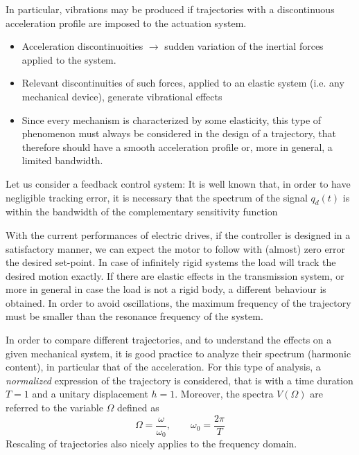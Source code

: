 \documentclass{book}
\begin{document}
In particular, vibrations may be produced if trajectories with a discontinuous acceleration profile are imposed to the actuation system. 
\begin{itemize}
    \item Acceleration discontinuoities $\rightarrow$ sudden variation of the inertial forces applied to the system. 
        \item Relevant discontinuities of such forces, applied to an elastic system (i.e. any mechanical device), generate vibrational effects 
            \item Since every mechanism is characterized by some elasticity, this type of phenomenon must always be considered in the design of a trajectory, that therefore should have a smooth acceleration profile or, more in general, a limited bandwidth.
\end{itemize}

Let us consider a feedback control system: It is well known that, in order to have negligible tracking error, it is necessary that the spectrum of the signal $q_d(t)$ is within the bandwidth of the complementary sensitivity function 

With the current performances of electric drives, if the controller is designed in a satisfactory manner, we can expect the motor to follow with (almost) zero error the desired set-point. In case of infinitely rigid systems the load will track the desired motion exactly. If there are elastic effects in the transmission system, or more in general in case the load is not a rigid body, a different behaviour is obtained. 
In order to avoid oscillations, the maximum frequency of the trajectory must be smaller than the resonance frequency of the system. 

In order to compare different trajectories, and to understand the effects on a given mechanical system, it is good practice to analyze their spectrum (harmonic content), in particular that of the acceleration. For this type of analysis, a \emph{normalized} expression of the trajectory is considered, that is with a time duration $T=1$ and a unitary displacement $h=1$. Moreover, the spectra $V(\Omega)$ are referred to the variable $\Omega$ defined as 
\[
    \Omega = \displaystyle\frac{\omega}{\omega_0}, \qquad \omega_0=\displaystyle\frac{2\pi}{T}
\]
Rescaling of trajectories also nicely applies to the frequency domain. 
\end{document}
